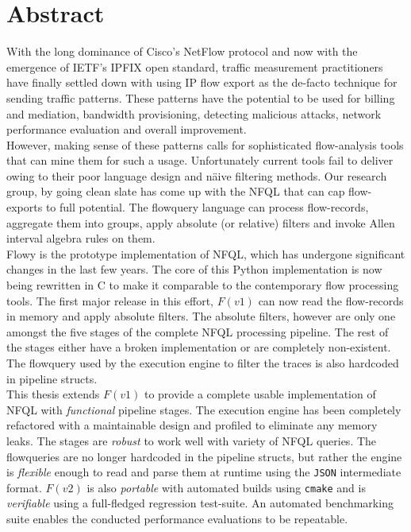 \begingroup
\let\clearpage\relax
\let\cleardoublepage\relax
\let\cleardoublepage\relax
\chapter*{Abstract}

With the long dominance of Cisco's NetFlow \cite{rfc3954} protocol and now
with the emergence of \ac{IETF}'s \ac{IPFIX} \cite{rfc5101} open standard,
traffic measurement practitioners have finally settled down with using \ac{IP}
flow export as the de-facto technique for sending traffic patterns. These
patterns have the potential to be used for billing and mediation, bandwidth
provisioning, detecting malicious attacks, network performance evaluation and
overall improvement. \\

However, making sense of these patterns calls for sophisticated flow-analysis
tools that can mine them for such a usage. Unfortunately current tools fail to
deliver owing to their poor language design and n\"aive filtering methods. Our
research group, by going clean slate has come up with the \ac{NFQL}
\cite{vmarinov:thesis:2009} that can cap flow-exports to full potential.
The flowquery language can process flow-records, aggregate them into groups,
apply absolute (or relative) filters and invoke Allen interval algebra rules
\cite{fallen:1983} on them. \\

Flowy \cite{kkanev:thesis:2009} is the prototype implementation of \ac{NFQL},
which has undergone significant changes in the last few years.  The core of
this Python implementation is now being rewritten in C to make it comparable
to the contemporary flow processing tools. The first major release in this
effort, $F(v1)$ \cite{jschauer:thesis:2011} can now read the flow-records in
memory and apply absolute filters. The absolute filters, however are only one
amongst the five stages of the complete \ac{NFQL} processing pipeline. The
rest of the stages either have a broken implementation or are completely
non-existent. The flowquery used by the execution engine to filter the traces
is also hardcoded in pipeline structs. \\

This thesis extends $F(v1)$ to provide a complete usable implementation of
\ac{NFQL} with \emph{functional} pipeline stages. The execution engine has
been completely refactored with a maintainable design and profiled to
eliminate any memory leaks. The stages are \emph{robust} to work well with
variety of \ac{NFQL} queries. The flowqueries are no longer hardcoded in the
pipeline structs, but rather the engine is \emph{flexible} enough to read and
parse them at runtime using the \texttt{JSON} intermediate format. $F(v2)$ is
also \emph{portable} with automated builds using \texttt{cmake} and is
\emph{verifiable} using a full-fledged regression test-suite. An automated
benchmarking suite enables the conducted performance evaluations to be
repeatable.

